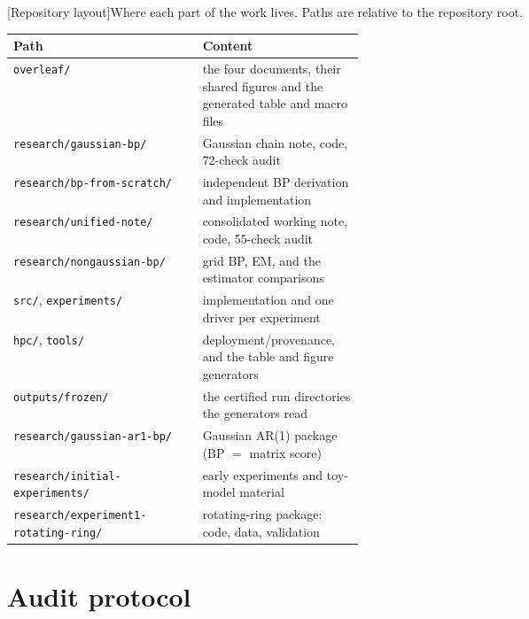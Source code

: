 \begin{center}
\begin{minipage}{\linewidth}\small\centering
{}[Repository layout]{Where each part of the work lives. Paths are relative to the repository root.}
\label{tab:repo-layout}
\begin{tabular}{@{}lp{0.46\linewidth}@{}}
\toprule
Path & Content \\
\midrule
\texttt{overleaf/} & the four documents, their shared figures and the
generated table and macro files \\
\texttt{research/gaussian-bp/} & Gaussian chain note, code, 72-check audit \\
\texttt{research/bp-from-scratch/} & independent BP derivation and implementation \\
\texttt{research/unified-note/} & consolidated working note, code, 55-check audit \\
\texttt{research/nongaussian-bp/} & grid BP, EM, and the estimator comparisons \\
\quad\texttt{src/}, \texttt{experiments/} & implementation and one driver per experiment \\
\quad\texttt{hpc/}, \texttt{tools/} & deployment/provenance, and the table and figure generators \\
\quad\texttt{outputs/frozen/} & the certified run directories the generators read \\
\texttt{research/gaussian-ar1-bp/} & Gaussian AR(1) package (BP $=$ matrix score) \\
\texttt{research/initial-experiments/} & early experiments and toy-model material \\
\texttt{research/experiment1-rotating-ring/} & rotating-ring package: code, data, validation \\
\bottomrule
\end{tabular}
\end{minipage}
\end{center}

\section{Audit protocol}

